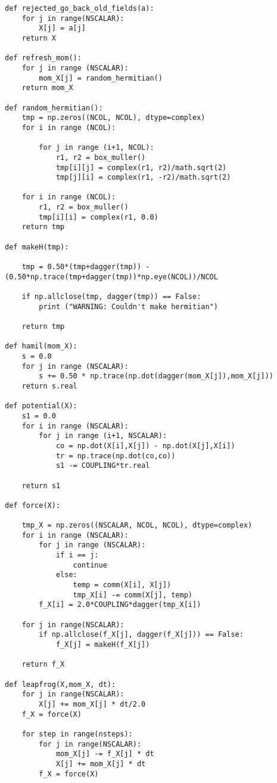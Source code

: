 \begin{lstlisting}
def rejected_go_back_old_fields(a):
    for j in range(NSCALAR):
        X[j] = a[j]
    return X

def refresh_mom():
    for j in range (NSCALAR):
        mom_X[j] = random_hermitian()
    return mom_X

def random_hermitian():
    tmp = np.zeros((NCOL, NCOL), dtype=complex)
    for i in range (NCOL):

        for j in range (i+1, NCOL):
            r1, r2 = box_muller()
            tmp[i][j] = complex(r1, r2)/math.sqrt(2)
            tmp[j][i] = complex(r1, -r2)/math.sqrt(2)

    for i in range (NCOL):
        r1, r2 = box_muller()
        tmp[i][i] = complex(r1, 0.0)
    return tmp 

def makeH(tmp):

    tmp = 0.50*(tmp+dagger(tmp)) - (0.50*np.trace(tmp+dagger(tmp))*np.eye(NCOL))/NCOL

    if np.allclose(tmp, dagger(tmp)) == False:
        print ("WARNING: Couldn't make hermitian")

    return tmp

def hamil(mom_X):
    s = 0.0 
    for j in range (NSCALAR):
        s += 0.50 * np.trace(np.dot(dagger(mom_X[j]),mom_X[j]))
    return s.real    

def potential(X):
    s1 = 0.0 
    for i in range (NSCALAR):
        for j in range (i+1, NSCALAR): 
            co = np.dot(X[i],X[j]) - np.dot(X[j],X[i])
            tr = np.trace(np.dot(co,co))
            s1 -= COUPLING*tr.real 

    return s1

def force(X):

    tmp_X = np.zeros((NSCALAR, NCOL, NCOL), dtype=complex)
    for i in range (NSCALAR): 
        for j in range (NSCALAR):
            if i == j:
                continue 
            else:
                temp = comm(X[i], X[j])
                tmp_X[i] -= comm(X[j], temp)
        f_X[i] = 2.0*COUPLING*dagger(tmp_X[i])

    for j in range(NSCALAR):
        if np.allclose(f_X[j], dagger(f_X[j])) == False:
            f_X[j] = makeH(f_X[j])

    return f_X  

def leapfrog(X,mom_X, dt):
    for j in range(NSCALAR):
        X[j] += mom_X[j] * dt/2.0
    f_X = force(X)

    for step in range(nsteps):
        for j in range(NSCALAR):
            mom_X[j] -= f_X[j] * dt
            X[j] += mom_X[j] * dt
        f_X = force(X)


\end{lstlisting}

